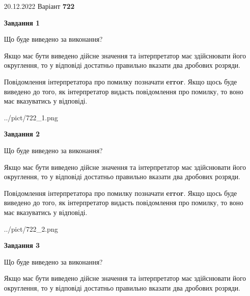 \documentclass[12pt, ukrainian]{article}
\begin{document}
{20.12.2022 Варіант \No \textbf { 722 }\par}
{
\begin {Large}

{\begin {center}\textbf{Завдання 1}\end {center}}\par
Що буде виведено за виконання? \par

Якщо має бути виведено дійсне значення та інтерпретатор має здійснювати його округлення, 
то у відповіді достатньо правильно вказати два дробових розряди.

Повідомлення інтерпретатора про помилку позначати \textbf{error}.
Якщо щось буде виведено до того, як інтерпретатор видасть повідомлення про помилку, 
то воно має вказуватись у відповіді. \par

\begin{center}
	{../pict/722_1.png}
\end{center}
\newpage

{\begin {center}\textbf{Завдання 2}\end {center}}\par
Що буде виведено за виконання? \par

Якщо має бути виведено дійсне значення та інтерпретатор має здійснювати його округлення, 
то у відповіді достатньо правильно вказати два дробових розряди.

Повідомлення інтерпретатора про помилку позначати \textbf{error}.
Якщо щось буде виведено до того, як інтерпретатор видасть повідомлення про помилку, 
то воно має вказуватись у відповіді. \par

\begin{center}
	{../pict/722_2.png}
\end{center}
\newpage

{\begin {center}\textbf{Завдання 3}\end {center}}\par
Що буде виведено за виконання? \par

Якщо має бути виведено дійсне значення та інтерпретатор має здійснювати його округлення, 
то у відповіді достатньо правильно вказати два дробових розряди.


\end{Large}}
\end{document}
